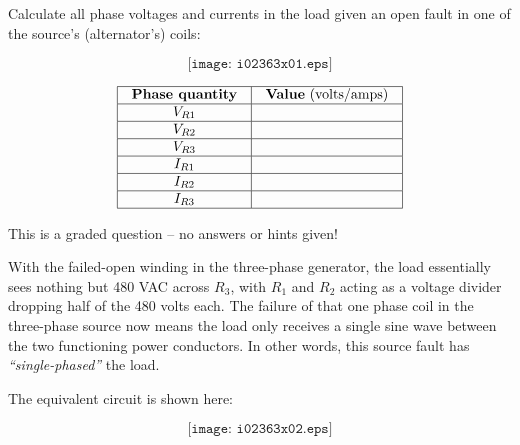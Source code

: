 

Calculate all phase voltages and currents in the load given an open fault in one of the source's (alternator's) coils:

$$\texttt{[image: i02363x01.eps]}$$


$$\vbox{\offinterlineskip
\halign{\strut
\vrule \quad\hfil # \ \hfil & 
\vrule \quad\hfil # \ \hfil \vrule \cr
\noalign{\hrule}
%
{\bf Phase quantity} & {\bf Value} (volts/amps) \cr
%
\noalign{\hrule}
%
$V_{R1}$ &  \cr
%
\noalign{\hrule}
%
$V_{R2}$ &  \cr
%
\noalign{\hrule}
%
$V_{R3}$ &  \cr
%
\noalign{\hrule}
%
$I_{R1}$ &  \cr
%
\noalign{\hrule}
%
$I_{R2}$ &  \cr
%
\noalign{\hrule}
%
$I_{R3}$ &  \cr
%
\noalign{\hrule}
} %
}$$ %

\vfil

\eject






This is a graded question -- no answers or hints given!







With the failed-open winding in the three-phase generator, the load essentially sees nothing but 480 VAC across $R_3$, with $R_1$ and $R_2$ acting as a voltage divider dropping half of the 480 volts each.  The failure of that one phase coil in the three-phase source now means the load only receives a single sine wave between the two functioning power conductors.  In other words, this source fault has {\it ``single-phased''} the load.

\vskip 10pt

The equivalent circuit is shown here:

$$\texttt{[image: i02363x02.eps]}$$


